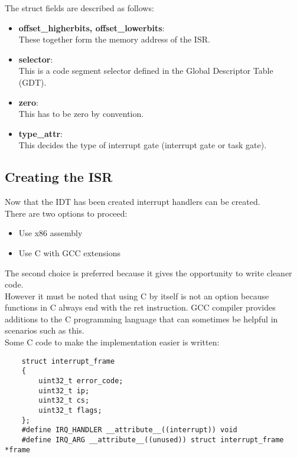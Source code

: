 \vspace{0.5cm}
The struct fields are described as follows:
\begin{itemize}
    \item \textbf{offset\_higherbits, offset\_lowerbits}:\\
    These together form the memory address of the ISR.
    \item \textbf{selector}:\\
    This is a code segment selector defined in the Global Descriptor Table (GDT).
    \item \textbf{zero}:\\
    This has to be zero by convention.
    \item \textbf{type\_attr}:\\
    This decides the type of interrupt gate (interrupt gate or task gate).
\end{itemize}
\pagebreak


\subsection{Creating the ISR}\label{subsection:Creating the ISR}

Now that the IDT has been created interrupt handlers can be created.\\
There are two options to proceed:
\begin{itemize}
    \item Use x86 assembly
    \item Use C with GCC extensions
\end{itemize}

The second choice is preferred because it gives the opportunity to write cleaner code.\\
However it must be noted that using C by itself is not an option because functions in C always end with the ret instruction.
GCC compiler provides additions to the C programming language that can sometimes be helpful in scenarios such as this.\\

Some C code to make the implementation easier is written:

\begin{lstlisting}
    struct interrupt_frame
    {
        uint32_t error_code;
        uint32_t ip;
        uint32_t cs;
        uint32_t flags;
    };
    #define IRQ_HANDLER __attribute__((interrupt)) void
    #define IRQ_ARG __attribute__((unused)) struct interrupt_frame *frame
\end{lstlisting}

